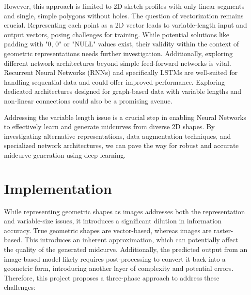 \documentclass[10pt, conference]{IEEEtran}
\begin{document}
However, this approach is limited to 2D sketch profiles with only linear segments and single, simple polygons without holes. The question of vectorization remains crucial. Representing each point as a 2D vector leads to variable-length input and output vectors, posing challenges for training. While potential solutions like padding with "0, 0" or "NULL" values exist, their validity within the context of geometric representations needs further investigation.
Additionally, exploring different network architectures beyond simple feed-forward networks is vital. Recurrent Neural Networks (RNNs) and specifically LSTMs are well-suited for handling sequential data and could offer improved performance. Exploring dedicated architectures designed for graph-based data with variable lengths and non-linear connections could also be a promising avenue.

Addressing the variable length issue is a crucial step in enabling Neural Networks to effectively learn and generate midcurves from diverse 2D shapes. By investigating alternative representations, data augmentation techniques, and specialized network architectures, we can pave the way for robust and accurate midcurve generation using deep learning.


\section{Implementation}
\label{sec:4}

While representing geometric shapes as images addresses both the representation and variable-size issues, it introduces a significant dilution in information accuracy. True geometric shapes are vector-based, whereas images are raster-based. This introduces an inherent approximation, which can potentially affect the quality of the generated midcurve. Additionally, the predicted output from an image-based model likely requires post-processing to convert it back into a geometric form, introducing another layer of complexity and potential errors.
Therefore, this project proposes a three-phase approach to address these challenges:
\end{document}
